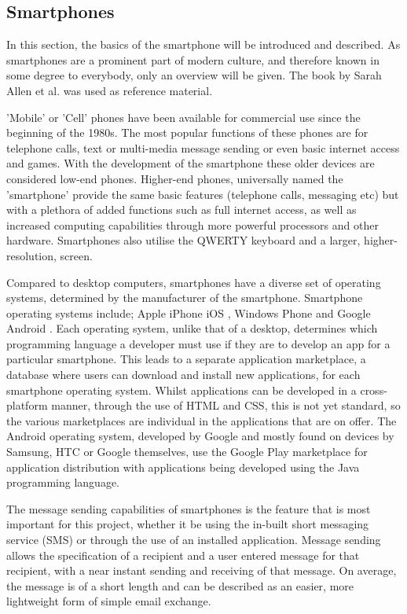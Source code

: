 \documentclass[a4paper,10pt]{report}
\begin{document}
\subsection{Smartphones}

In this section, the basics of the smartphone will be introduced and described. As smartphones are a prominent part of modern culture, and therefore known in some degree to everybody, only an overview will be given. The book by Sarah Allen et al. \cite{whatisasmartphone} was used as reference material.

'Mobile' or 'Cell' phones have been available for commercial use since the beginning of the 1980s. The most popular functions of these phones are for telephone calls, text or multi-media message sending or even basic internet access and games. With the development of the smartphone these older devices are considered low-end phones. Higher-end phones, universally named the 'smartphone' provide the same basic features (telephone calls, messaging etc) but with a plethora of added functions such as full internet access, as well as increased computing capabilities through more powerful processors and other hardware. Smartphones also utilise the QWERTY keyboard and a larger, higher-resolution, screen. 

Compared to desktop computers, smartphones have a diverse set of operating systems, determined by the manufacturer of the smartphone. Smartphone operating systems include; Apple iPhone iOS \cite{appleios}, Windows Phone \cite{windowsphone} and Google Android \cite{googleandroid}. Each operating system, unlike that of a desktop, determines which programming language a developer must use if they are to develop an app for a particular smartphone. This leads to a separate application marketplace, a database where users can download and install new applications, for each smartphone operating system. Whilst applications can be developed in a cross-platform manner, through the use of HTML and CSS, this is not yet standard, so the various marketplaces are individual in the applications that are on offer. The Android operating system, developed by Google and mostly found on devices by Samsung, HTC or Google themselves, use the Google Play marketplace \cite{googleplay} for application distribution with applications being developed using the Java programming language.

The message sending capabilities of smartphones is the feature that is most important for this project, whether it be using the in-built short messaging service (SMS) or through the use of an installed application. Message sending allows the specification of a recipient and a user entered message for that recipient, with a near instant sending and receiving of that message. On average, the message is of a short length and can be described as an easier, more lightweight form of simple email exchange. 
\end{document}
